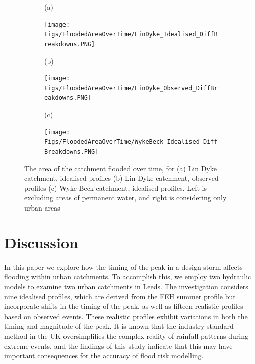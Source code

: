 \documentclass[APA,Times2COL]{WileyNJDv5}
\begin{document}
\begin{figure}[tb]
  \centering
  \begin{subfigure}[b]{\textwidth}
    (a)
  \end{subfigure}
  \begin{subfigure}[t]{0.45\textwidth}
  \texttt{[image: Figs/FloodedAreaOverTime/LinDyke\_Idealised\_DiffBreakdowns.PNG]}
  \end{subfigure}\hfill
  \begin{subfigure}[t]{\textwidth}
    (b)
  \end{subfigure}
  \begin{subfigure}[t]{0.45\textwidth}
\texttt{[image: Figs/FloodedAreaOverTime/LinDyke\_Observed\_DiffBreakdowns.PNG]}
  \end{subfigure}
    \begin{subfigure}[t]{\textwidth}
    (c)
  \end{subfigure}
  \begin{subfigure}[t]{0.45\textwidth}
\texttt{[image: Figs/FloodedAreaOverTime/WykeBeck\_Idealised\_DiffBreakdowns.PNG]}
  \end{subfigure}
 \caption{The area of the catchment flooded over time, for (a) Lin Dyke catchment, idealised profiles (b) Lin Dyke catchment, observed profiles (c) Wyke Beck catchment, idealised profiles. Left is excluding areas of permanent water, and right is considering only urban areas }\label{fig:flooded_area_over_time} 
\end{figure}


\section{Discussion}\label{sec:discussion}

In this paper we explore how the timing of the peak in a design storm affects flooding within urban catchments. To accomplish this, we employ two hydraulic models to examine two urban catchments in Leeds. The investigation considers nine idealised profiles, which are derived from the FEH summer profile but incorporate shifts in the timing of the peak, as well as  fifteen realistic profiles based on observed events. These realistic profiles exhibit variations in both the timing and magnitude of the peak. It is known that the industry standard method in the UK oversimplifies the complex reality of rainfall patterns during extreme events, and the findings of this study indicate that this may have important consequences for the accuracy of flood risk modelling.
\end{document}
